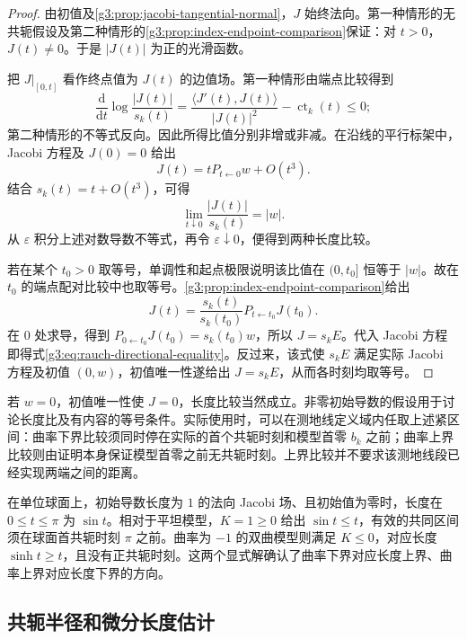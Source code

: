 \begin{proof}
	由初值及\cref{g3:prop:jacobi-tangential-normal}，\(J\) 始终法向。第一种情形的无共轭假设及第二种情形的\cref{g3:prop:index-endpoint-comparison}保证：对 \(t>0\)，\(J(t)\ne0\)。于是 \(|J(t)|\) 为正的光滑函数。

	把 \(J|_{[0,t]}\) 看作终点值为 \(J(t)\) 的边值场。第一种情形由端点比较得到
	\[
		\frac{\mathrm d}{\mathrm dt}
		\log\frac{|J(t)|}{s_k(t)}
		=\frac{\langle J'(t),J(t)\rangle}{|J(t)|^2}
		-\operatorname{ct}_k(t)\le0;
	\]
	第二种情形的不等式反向。因此所得比值分别非增或非减。在沿线的平行标架中，Jacobi 方程及 \(J(0)=0\) 给出
	\[
		J(t)=tP_{t\leftarrow0}w+O(t^3).
	\]
	结合 \(s_k(t)=t+O(t^3)\)，可得
	\[
		\lim_{t\downarrow0}\frac{|J(t)|}{s_k(t)}=|w|.
	\]
	从 \(\varepsilon\) 积分上述对数导数不等式，再令 \(\varepsilon\downarrow0\)，便得到两种长度比较。

	若在某个 \(t_0>0\) 取等号，单调性和起点极限说明该比值在 \((0,t_0]\) 恒等于 \(|w|\)。故在 \(t_0\) 的端点配对比较中也取等号。\cref{g3:prop:index-endpoint-comparison}给出
	\[
		J(t)=\frac{s_k(t)}{s_k(t_0)}P_{t\leftarrow t_0}J(t_0).
	\]
	在 \(0\) 处求导，得到 \(P_{0\leftarrow t_0}J(t_0)=s_k(t_0)w\)，所以 \(J=s_kE\)。代入 Jacobi 方程即得式\eqref{g3:eq:rauch-directional-equality}。反过来，该式使 \(s_kE\) 满足实际 Jacobi 方程及初值 \((0,w)\)，初值唯一性遂给出 \(J=s_kE\)，从而各时刻均取等号。
\end{proof}

若 \(w=0\)，初值唯一性使 \(J=0\)，长度比较当然成立。非零初始导数的假设用于讨论长度比及有内容的等号条件。实际使用时，可以在测地线定义域内任取上述紧区间：曲率下界比较须同时停在实际的首个共轭时刻和模型首零 \(b_k\) 之前；曲率上界比较则由证明本身保证模型首零之前无共轭时刻。上界比较并不要求该测地线段已经实现两端之间的距离。

\begin{example}\label{g3:exm:rauch-model-directions}
	在单位球面上，初始导数长度为 \(1\) 的法向 Jacobi 场、且初始值为零时，长度在 \(0\le t\le\pi\) 为 \(\sin t\)。相对于平坦模型，\(K=1\ge0\) 给出 \(\sin t\le t\)，有效的共同区间须在球面首共轭时刻 \(\pi\) 之前。曲率为 \(-1\) 的双曲模型则满足 \(K\le0\)，对应长度 \(\sinh t\ge t\)，且没有正共轭时刻。这两个显式解确认了曲率下界对应长度上界、曲率上界对应长度下界的方向。
\end{example}

\subsection{共轭半径和微分长度估计}
\label{g3:subsec:0701:04}

